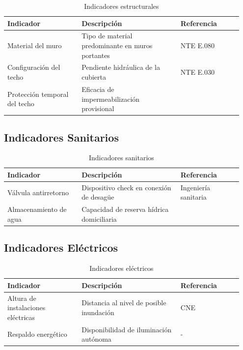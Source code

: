 \documentclass[12pt, letterpaper]{article}
\begin{document}
\begin{table}[H]
\centering
\caption{Indicadores estructurales}
\label{tab:ind_estructurales}
\begin{tabular}{@{}p{0.3\linewidth}p{0.4\linewidth}p{0.25\linewidth}@{}}
\toprule
\textbf{Indicador} & \textbf{Descripción} & \textbf{Referencia} \\ \midrule
Material del muro & Tipo de material predominante en muros portantes & NTE E.080 \parencite{min_vivienda_rne} \\
Configuración del techo & Pendiente hidráulica de la cubierta & NTE E.030 \parencite{min_vivienda_rne} \\
Protección temporal del techo & Eficacia de impermeabilización provisional & \parencite{typsa_drenaje} \\ \bottomrule
\end{tabular}
\end{table}

\subsection{Indicadores Sanitarios}

\begin{table}[H]
\centering
\caption{Indicadores sanitarios}
\label{tab:ind_sanitarios}
\begin{tabular}{@{}p{0.3\linewidth}p{0.4\linewidth}p{0.25\linewidth}@{}}
\toprule
\textbf{Indicador} & \textbf{Descripción} & \textbf{Referencia} \\ \midrule
Válvula antirretorno & Dispositivo check en conexión de desagüe & Ingeniería sanitaria \parencite{usat_drenaje} \\
Almacenamiento de agua & Capacidad de reserva hídrica domiciliaria & \parencite{geresa_sala} \\ \bottomrule
\end{tabular}
\end{table}

\subsection{Indicadores Eléctricos}

\begin{table}[H]
\centering
\caption{Indicadores eléctricos}
\label{tab:ind_electricos}
\begin{tabular}{@{}p{0.3\linewidth}p{0.4\linewidth}p{0.25\linewidth}@{}}
\toprule
\textbf{Indicador} & \textbf{Descripción} & \textbf{Referencia} \\ \midrule
Altura de instalaciones eléctricas & Distancia al nivel de posible inundación & CNE \parencite{osinergmin_cne} \\
Respaldo energético & Disponibilidad de iluminación autónoma & - \\ \bottomrule
\end{tabular}
\end{table}
\end{document}
